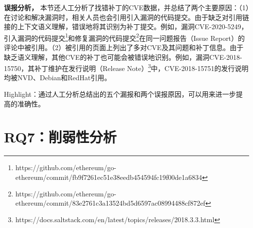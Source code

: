 \textbf{误报分析，}
本节还人工分析了\tool 找错补丁的CVE数据，并总结了两个主要原因：（1）在讨论和解决漏洞时，相关人员也会引用引入漏洞的代码提交。由于\tool 缺乏对引用链接的上下文语义理解，\tool 错误地将其识别为补丁提交。例如，漏洞CVE-2020-5249，引入漏洞的代码提交\footnote{https://github.com/ethereum/go-ethereum/commit/fb9f7261ec51e38eedb454594fc19f00de1a6834}和修复漏洞的代码提交\footnote{https://github.com/ethereum/go-ethereum/commit/83e2761c3a13524bd5d6597ac08994488cf872ef}在同一问题报告（Issue Report）的评论中被引用。（2）被引用的页面上列出了多对CVE及其问题和补丁信息。由于\tool 缺乏语义理解，其他CVE的补丁也可能会被\tool 错误地识别。例如，漏洞CVE-2018-15750，其补丁维护在发行说明（Release Note）\footnote{https://docs.saltstack.com/en/latest/topics/releases/2018.3.3.html}中，CVE-2018-15751的发行说明均被NVD、Debian和RedHat引用。


\begin{tcolorbox}[size=title,opacityfill=0.15]
Highlight：通过人工分析总结出的五个漏报和两个误报原因，可以用来进一步提高\tool 的准确性。
\end{tcolorbox}

\section{RQ7：削弱性分析}\label{sec:ablation}

